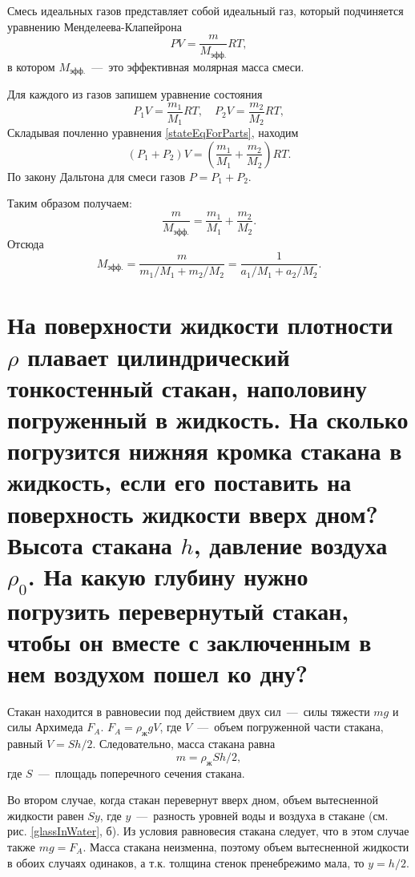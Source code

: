 \solving{}

Смесь идеальных газов представляет собой идеальный газ, который
подчиняется уравнению Менделеева-Клапейрона
\begin{equation}
  PV = \frac{m}{M_\text{эфф.}}RT,
\end{equation}
в котором $M_\text{эфф.}$~---~это эффективная молярная масса
смеси.

Для каждого из газов запишем уравнение состояния
\begin{equation*} \label{stateEqForParts}
  P_1V = \frac{m_1}{M_1}RT, \quad P_2V = \frac{m_2}{M_2}RT,
\end{equation*}
Складывая почленно уравнения \ref{stateEqForParts}, находим
\begin{equation*}
  (P_1+P_2)V = \left (\frac{m_1}{M_1}+\frac{m_2}{M_2} \right )RT.
\end{equation*}
По закону Дальтона для смеси газов $P = P_1 +P_2$.

Таким образом получаем: 
\begin{equation*}
  \frac{m}{M_\text{эфф.}} = \frac{m_1}{M_1} + \frac{m_2}{M_2}.
\end{equation*}
Отсюда 
\begin{equation}
  M_\text{эфф.} = \frac{m}{m_1/M_1 + m_2/M_2} = \frac{1}{a_1/M_1 + a_2/M_2}.
\end{equation}

\section{На поверхности жидкости плотности $\rho$ плавает
цилиндрический тонкостенный стакан, наполовину погруженный в жидкость.
На сколько погрузится нижняя кромка стакана в жидкость, если его
поставить на поверхность жидкости вверх дном? Высота стакана $h$,
давление воздуха $\rho_0$. На какую глубину нужно
погрузить перевернутый стакан, чтобы он вместе с заключенным в нем воздухом пошел ко дну?}

\solving{}

Стакан находится в равновесии под действием двух сил~---~силы тяжести $mg$ и силы Архимеда $F_A$. $F_A = \rho_\text{ж}gV$, где $V$~---~объем
погруженной части стакана, равный $V = S h/2$. Следовательно, масса
стакана равна
\begin{equation}
  m = \rho_\text{ж} S h /2,
\end{equation}
где $S$~---~площадь поперечного сечения стакана.

Во втором случае, когда стакан перевернут вверх дном, объем вытесненной жидкости равен $S y$, где $y$~---~разность уровней воды и воздуха в стакане (см. рис. \ref{glassInWater}, б). Из условия равновесия стакана
следует, что в этом случае также $mg = F_A$. Масса
стакана неизменна, поэтому объем вытесненной жидкости в обоих случаях одинаков, а т.к. толщина стенок пренебрежимо мала, то $y = h/2$.

